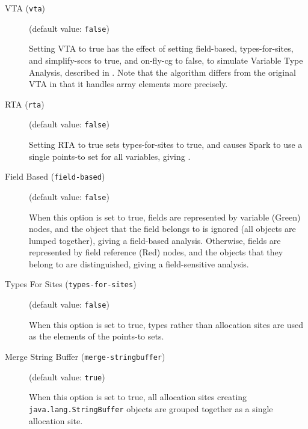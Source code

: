 \documentclass{article}
\begin{document}
\begin{description}

\item[VTA ({\tt vta})]
(default value: {\tt false})




Setting VTA to true has the effect of setting field-based,
types-for-sites, and simplify-sccs to true, and on-fly-cg to false,
to simulate Variable Type
Analysis, described in . Note that the
algorithm differs from the original VTA in that it handles array
elements more precisely.
        


\item[RTA ({\tt rta})]
(default value: {\tt false})




Setting RTA to true sets types-for-sites to true, and causes Spark to use
a single points-to set for all variables, giving .
        


\item[Field Based ({\tt field-based})]
(default value: {\tt false})




When this option is set to true, fields are represented by variable
(Green) nodes, and the object that the field belongs to is ignored
(all objects are lumped together), giving a field-based analysis. Otherwise, fields are represented by
field reference (Red) nodes, and the objects that they belong to are
distinguished, giving a field-sensitive analysis.
        


\item[Types For Sites ({\tt types-for-sites})]
(default value: {\tt false})




When this option is set to true, types rather than allocation sites are
used as the elements of the points-to sets.
        


\item[Merge String Buffer ({\tt merge-stringbuffer})]
(default value: {\tt true})




When this option is set to true, all allocation sites creating
{\tt java.lang.StringBuffer} objects are grouped together as a single
allocation site.
        



\end{description}
\end{document}
